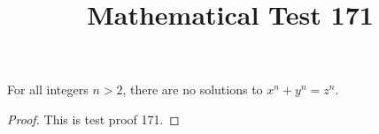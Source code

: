 \documentclass{amsart}
\begin{document}
\title{Mathematical Test 171}
\begin{theorem}
For all integers $n > 2$, there are no solutions to $x^n + y^n = z^n$.
\end{theorem}
\begin{proof}
This is test proof 171.
\end{proof}
\end{document}
